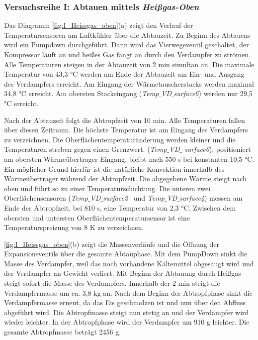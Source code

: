 \newpage
\subsubsection*{Versuchsreihe I: Abtauen mittels \textit{Heißgas-Oben}}

Das Diagramm \ref{fig:I_Heissgas_oben}(a) zeigt den Verlauf der Temperatursensoren am Luftkühler über die Abtauzeit. Zu Beginn des Abtauens wird ein Pumpdown durchgeführt. Dann wird das Vierwegeventil geschaltet, der Kompressor läuft an und heißes Gas fängt an durch den Verdampfer zu strömen. Alle Temperaturen steigen in der Abtauzeit von 2 min simultan an. Die maximale Temperatur von 43,3 °C werden am Ende der Abtauzeit am Ein- und Ausgang des Verdampfers erreicht. 
Am Eingang der Wärmetauscherstacks werden maximal 34,8 °C erreicht. Am obersten Stackeingang (\textit{Temp$\_$VD$\_$surface6}) werden nur 29,5 °C erreicht. 

Nach der Abtauzeit folgt die Abtropfzeit von 10 min. Alle Temperaturen fallen über diesen Zeitraum. Die höchste Temperatur ist am Eingang des Verdampfers zu verzeichnen. Die Oberflächentemperaturänderung werden kleiner und die Temperaturen streben gegen einen Grenzwert. (\textit{Temp$\_$VD$\_$-surface6}), positioniert am obersten Wärmeübertrager-Eingang, bleibt nach 550 s bei konstanten 10,5 °C. Ein möglicher Grund hierfür ist die natürliche Konvektion innerhalb des Wärmeübertrager während der Abtropfzeit. Die abgegebene Wärme steigt nach oben und führt so zu einer Temperaturschichtung. Die unteren zwei Oberflächensensoren (\textit{Temp$\_$VD$\_$surface2}~ und  \textit{Temp$\_$VD$\_$surface4}) messen am Ende der Abtropfzeit, bei 810 s, eine Temperatur von 2,3 °C. Zwischen dem obersten und untersten Oberflächentemperatursensor ist eine Temperaturspreizung von 8 K zu verzeichnen. 

\ref{fig:I_Heissgas_oben}(b) zeigt die Massenverläufe und die Öffnung der Expansionsventils über die gesamte Abtauphase. Mit dem PumpDown sinkt die Masse des Verdampfer, weil das noch vorhandene Kältemittel abgesaugt wird und der Verdampfer an Gewicht verliert. Mit Beginn der Abtauung durch Heißgas steigt sofort die Masse des Verdampfers. Innerhalb der 2 min steigt die Verdampfermasse um ca. 3,8 kg an. Nach dem Beginn der Abtropfphase sinkt die Verdampfermasse erneut, da das Eis geschmolzen ist und nun über den Abfluss abgeführt wird. Die Abtropfmasse steigt nun stetig an und der Verdampfer wird wieder leichter. In der Abtropfphase wird der Verdampfer um 910 g leichter. Die gesamte Abtropfmasse beträgt 2456 g. 


